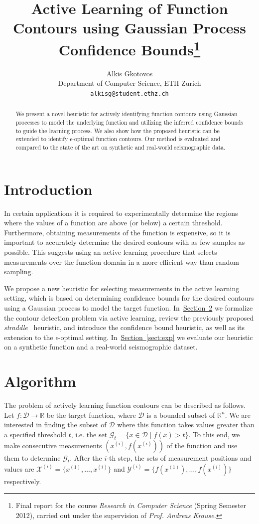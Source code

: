 \documentclass[11pt]{article} %
\title{Active Learning of Function Contours using Gaussian Process Confidence Bounds\thanks{Final
report for the course \emph{Research in Computer Science} (Spring
Semester 2012), carried out under the supervision of \emph{Prof. Andreas Krause.}}}
\author{
Alkis Gkotovos\\
Department of Computer Science, ETH Zurich\\
\texttt{alkisg@student.ethz.ch}
}
\newcommand{\sectref}[1]{\hyperref[#1]{\mbox{Section~\ref*{#1}}}}
\begin{document}
\maketitle

\begin{abstract}
We present a novel heuristic for actively identifying function
contours using Gaussian processes to model the underlying
function and utilizing the
inferred confidence bounds to guide the learning process. We also show how
the proposed heuristic can be extended to identify $\epsilon$-optimal function
contours. Our method is evaluated and compared to the state of the art on
synthetic and real-world seismographic data.
\end{abstract}

\section{Introduction}
In certain applications it is required to experimentally determine the regions
where the values of a function are above (or below) a certain threshold.
Furthermore, obtaining measurements of the function is expensive, so it is
important to
accurately determine the desired contours with as few samples as possible.
This suggests using an active learning procedure that selects measurements
over the function domain in a more efficient way than random sampling.

We propose a new heuristic for selecting measurements in the active learning
setting, which is based on
determining confidence bounds for the desired contours using a Gaussian
process to model the target function.
In~\sectref{sect:algo} we formalize the contour detection problem via active
learning,
review the previously proposed \emph{straddle}~\cite{bryan2005} heuristic,
and introduce the confidence bound heuristic, as well as its extension
to the $\epsilon$-optimal setting. In~\sectref{sect:exp} we
evaluate our heuristic on a synthetic function and a real-world seismographic
dataset.

\section{Algorithm} \label{sect:algo}
The problem of actively learning function contours can be described as follows.
Let ${f : \mathcal{D} \to \mathbb{R}}$ be the target function, where
$\mathcal{D}$ is a bounded subset of $\mathbb{R}^n$. We are interested in
finding the subset of $\mathcal{D}$ where this function takes values greater
than a specified threshold $t$, i.e. the set
$\mathcal{G}_t = \{x \in \mathcal{D} \mid f(x) > t\}$. To this end, we make
consecutive measurements $(x^{(i)}, f(x^{(i)}))$ of the function
and use them to determine $\mathcal{G}_t$. After the $i$-th step, the sets of
measurement positions and values are
$\mathcal{X}^{(i)} = \{x^{(1)},\ldots,x^{(i)}\}$ and
$\mathcal{Y}^{(i)} = \{f(x^{(1)}),\ldots,f(x^{(i)})\}$ respectively.
\end{document}
